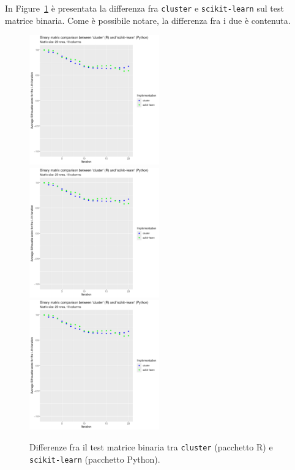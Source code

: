 \documentclass[italian]{article}
\begin{document}
			In Figure~\ref{fig:cmp} è presentata la differenza fra
			\texttt{cluster} e \texttt{scikit-learn} sul test matrice
			binaria. Come è possibile notare, la differenza fra i due
			è contenuta.

			\begin{figure}[h]
				\centering
				\includegraphics[width = 0.5\textwidth, height = 0.3\textheight, page = 1]{results/Final_comparison.pdf}
				\includegraphics[width = 0.5\textwidth, height = 0.3\textheight, page = 2]{results/Final_comparison.pdf}
				\includegraphics[width = 0.5\textwidth, height = 0.3\textheight, page = 3]{results/Final_comparison.pdf}
				\caption{Differenze fra il test matrice binaria tra \texttt{cluster} (pacchetto R)
				e \texttt{scikit-learn} (pacchetto Python).}
				\label{fig:cmp}
			\end{figure}
\end{document}
